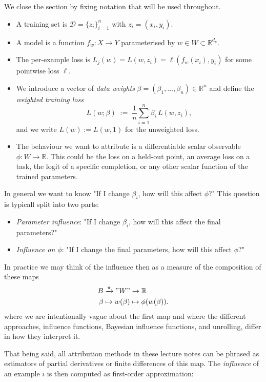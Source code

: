 \documentclass[11pt]{article}
\begin{document}
We close the section by fixing notation that will be used throughout.
\begin{itemize}
\item A training set is $\mathcal{D} = \{z_i\}_{i=1}^n$ with $z_i = (x_i, y_i)$.
\item A model is a function $f_w: X \to Y$ parameterised by $w \in W \subset \mathbb{R}^{d_p}$.
\item The per-example loss is $L_j(w)=L(w, z_i) = \ell(f_w(x_i), y_i)$ for some pointwise loss $\ell$. 
\item We introduce a vector of \emph{data weights} $\beta = (\beta_1, \ldots, \beta_n) \in \mathbb{R}^n$ and define the \emph{weighted training loss}
\[
  L(w; \beta) \;:=\; \frac{1}{n}\sum_{i=1}^n \beta_i\, L(w, z_i),
\]
and we write $L(w) := L(w, 1)$ for the unweighted loss.
\item The behaviour we want to attribute is a differentiable scalar observable $\phi: W \to \mathbb{R}$. This could be the loss on a held-out point, an average loss on a task, the logit of a specific completion, or any other scalar function of the trained parameters.  
\end{itemize}  

In general we want to know "If I change $\beta_i$, how will this affect $\phi$?" This question is typicall split into two parts:
\begin{itemize}
  \item \emph{Parameter influence}: "If I change $\beta_i$, how will this affect the final parameters?"
  \item \emph{Influence on $\phi$}: "If I change the final parameters, how will this affect $\phi$?"
\end{itemize}
In practice we may think of the influence then as a measure of the composition of these maps
\begin{align}\label{eq:holy-maps}
  B &\xrightarrow{\pi} "W"\to \mathbb{R} \\
  \beta &\mapsto w(\beta) \mapsto \phi(w(\beta)).
\end{align}
where we are intentionally vague about the first map and where the different approaches, influence functions, Bayesian influence functions, and unrolling, differ in how they interpret it.

That being said, all attribution methods in these lecture notes can be phrased as estimators of partial derivatives or finite differences of this map. The \emph{influence} of an example $i$ is then computed as first-order approximation:
\end{document}
